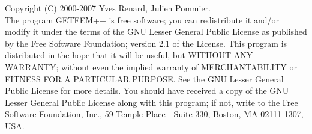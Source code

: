 Copyright (C) 2000-2007 Yves Renard, Julien Pommier.\\
The program GETFEM++ is free software; you can redistribute it and/or modify
it under the terms of the GNU Lesser General Public License as published by
the Free Software Foundation; version 2.1 of the License.
This program is distributed in the hope that it will be useful,
but WITHOUT ANY WARRANTY; without even the implied warranty of
MERCHANTABILITY or FITNESS FOR A PARTICULAR PURPOSE.  See the
GNU Lesser General Public License for more details.
You should have received a copy of the GNU  Lesser General Public License
along with this program; if not, write to the Free Software Foundation,
Inc., 59 Temple Place - Suite 330, Boston, MA  02111-1307, USA.
